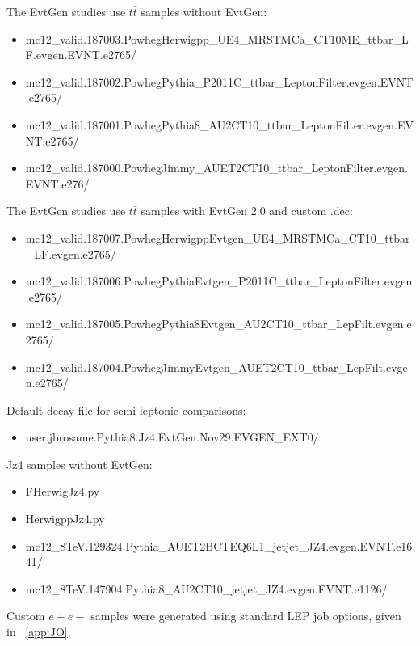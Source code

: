 The EvtGen studies use $t \bar{t}$ samples without EvtGen:
\begin{itemize}
\item mc12\_valid.187003.PowhegHerwigpp\_UE4\_MRSTMCa\_CT10ME\_ttbar\_LF.evgen.EVNT.e2765/
\item mc12\_valid.187002.PowhegPythia\_P2011C\_ttbar\_LeptonFilter.evgen.EVNT.e2765/
\item mc12\_valid.187001.PowhegPythia8\_AU2CT10\_ttbar\_LeptonFilter.evgen.EVNT.e2765/
\item mc12\_valid.187000.PowhegJimmy\_AUET2CT10\_ttbar\_LeptonFilter.evgen.EVNT.e276/
\end{itemize}
The EvtGen studies use $t \bar{t}$ samples with EvtGen 2.0 and custom .dec:
\begin{itemize}
\item mc12\_valid.187007.PowhegHerwigppEvtgen\_UE4\_MRSTMCa\_CT10\_ttbar\_LF.evgen.e2765/
\item mc12\_valid.187006.PowhegPythiaEvtgen\_P2011C\_ttbar\_LeptonFilter.evgen.e2765/
\item mc12\_valid.187005.PowhegPythia8Evtgen\_AU2CT10\_ttbar\_LepFilt.evgen.e2765/
\item mc12\_valid.187004.PowhegJimmyEvtgen\_AUET2CT10\_ttbar\_LepFilt.evgen.e2765/
\end{itemize}

Default decay file for semi-leptonic comparisons:
\begin{itemize}
\item user.jbrosame.Pythia8.Jz4.EvtGen.Nov29.EVGEN\_EXT0/
\end{itemize}

Jz4 samples without EvtGen:
\begin{itemize}
\item FHerwigJz4.py
\item HerwigppJz4.py
\item mc12\_8TeV.129324.Pythia\_AUET2BCTEQ6L1\_jetjet\_JZ4.evgen.EVNT.e1641/
\item mc12\_8TeV.147904.Pythia8\_AU2CT10\_jetjet\_JZ4.evgen.EVNT.e1126/
\end{itemize}

Custom $e+e-$ samples were generated using standard LEP job options, given in ~\ref{app:JO}.

